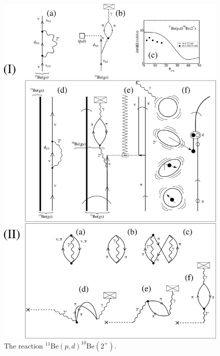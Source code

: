   \begin{figure}
  \centerline{\includegraphics*[width=15cm,angle=0]{C8/figsC8/Fig3}}
  	\caption{The reaction $^{11}$Be$(p,d)^{10}$Be$(2^+)$.}\label{fig6.6.2}
  \end{figure}
  
